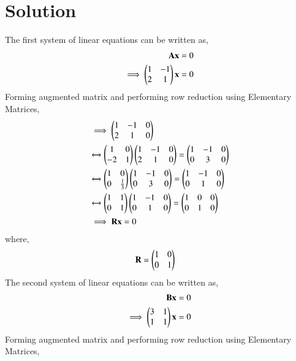 \documentclass[journal,12pt,twocolumn]{IEEEtran}
\begin{document}
\section{Solution}
The first system of linear equations can be written as,  
\begin{align}
    \mathbf{A}\mathbf{x} &= 0 \label{ax=0}\\
    \implies\begin{pmatrix}1&-1\\2&1\end{pmatrix}\mathbf{x} &= 0
\end{align}
Forming augmented matrix and performing row reduction using Elementary Matrices, 
\begin{align}
    &\implies \begin{pmatrix}1&-1&0\\2&1&0\end{pmatrix} \\
    &\xleftrightarrow{}\begin{pmatrix}1&0\\-2&1\end{pmatrix}\begin{pmatrix}1&-1&0\\2&1&0\end{pmatrix} = \begin{pmatrix}1&-1&0\\0&3&0\end{pmatrix} \\
    &\xleftrightarrow{}\begin{pmatrix}1&0\\0&\frac{1}{3}\end{pmatrix}\begin{pmatrix}1&-1&0\\0&3&0\end{pmatrix} = \begin{pmatrix}1&-1&0\\0&1&0\end{pmatrix} \\
    &\xleftrightarrow{}\begin{pmatrix}1&1\\0&1\end{pmatrix}\begin{pmatrix}1&-1&0\\0&1&0\end{pmatrix} = \begin{pmatrix}1&0&0\\0&1&0\end{pmatrix}\\
    &\implies\mathbf{R}\mathbf{x}=0
\end{align}
where, 
\begin{align}
    \mathbf{R} &= \begin{pmatrix}1&0\\0&1\end{pmatrix} \label{R}
\end{align}
The second system of linear equations can be written as, 
\begin{align}
    \mathbf{B}\mathbf{x} &= 0 \label{bx=0}\\
    \implies\begin{pmatrix}3&1\\1&1\end{pmatrix}\mathbf{x} &= 0
\end{align}
Forming augmented matrix and performing row reduction using Elementary Matrices, 
\end{document}
